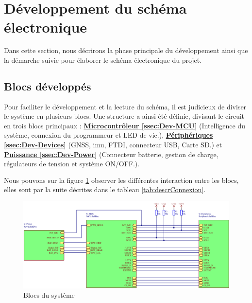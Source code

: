\section{Développement du schéma électronique} \label{sec:Dev-Schematique}
Dans cette section, nous décrirons la phase principale du développement ainsi que la démarche suivie pour élaborer le schéma électronique du projet.

\subsection{Blocs développés} \label{ssec:Dev-blocs}
Pour faciliter le développement et la lecture du schéma, il est judicieux de diviser le système en plusieurs blocs. Une structure a ainsi été définie, divisant le circuit en trois blocs principaux : \hyperref[ssec:Dev-MCU]{\textbf{Microcontrôleur \ref{ssec:Dev-MCU}}} (Intelligence du système, connexion du programmeur et LED de vie.), \hyperref[ssec:Dev-Devices]{\textbf{Périphériques \ref{ssec:Dev-Devices}}} (\gls{GNSS}, \gls{imu}, \gls{FTDI}, connecteur USB, Carte SD.) et \hyperref[ssec:Dev-Power]{\textbf{Puissance \ref{ssec:Dev-Power}}} (Connecteur batterie, gestion de charge, régulateurs de tension et système ON/OFF.).

Nous pouvons sur la figure \ref{fig:blocs} observer les différentes interaction entre les blocs, elles sont par la suite décrites dans le tableau \ref{tab:descrConnexion}.

\begin{figure}[h]
	\centering
	\includegraphics[width=.95\linewidth]{../figures/etude/sch/BLOCS}
	\caption{Blocs du système}
	\label{fig:blocs}
\end{figure}

